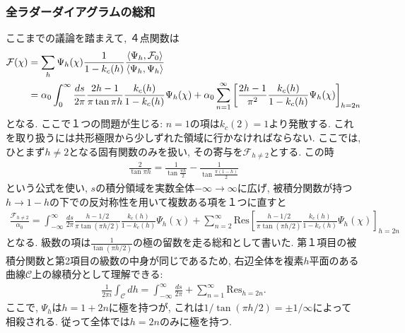 \subsubsection{全ラダーダイアグラムの総和}
ここまでの議論を踏まえて, ４点関数は
\begin{align}
	\mathcal{F}(\chi)
	&= \sum_h\Psi_h(\chi)\frac{1}{1 - k_c(h)}
		\frac{\langle \Psi_h, \mathcal{F}_0 \rangle}{\langle \Psi_h, \Psi_h \rangle}\nonumber\\
	&= \alpha_0\int_0^{\infty}\frac{ds}{2\pi}\frac{2h-1}{\pi\tan\pi h}
		\frac{k_c(h)}{1-k_c(h)}\Psi_h(\chi)
	+ \alpha_0\sum_{n=1}^{\infty}\left[
		\frac{2h-1}{\pi^2}\frac{k_c(h)}{1-k_c(h)}\Psi_h(\chi)
	\right]_{h=2n}
	\label{eq:all_sum_of_ladders}
\end{align}
となる. 
ここで１つの問題が生じる: $n = 1$の項は$k_c(2) = 1$より発散する. 
これを取り扱うには共形極限から少しずれた領域に行かなければならない. 
ここでは, ひとまず$h\neq2$となる固有関数のみを扱い, その寄与を$\mathcal{F}_{h\neq2}$とする.
この時
\begin{align}
	\frac{2}{\tan\pi h} = \frac{1}{\tan\frac{\pi h}{2}} - \frac{1}{\tan\frac{\pi(1-h)}{2}}
\end{align}
という公式を使い, $s$の積分領域を実数全体$-\infty\to\infty$に広げ, 
被積分関数が持つ$h\to1-h$の下での反対称性を用いて複数ある項を１つに直すと
\begin{align}
	\frac{\mathcal{F}_{h\neq2}}{\alpha_0}
	= \int_{-\infty}^{\infty}\frac{ds}{2\pi}\frac{h - 1/2}{\pi\tan(\pi h / 2)}
		\frac{k_c(h)}{1-k_c(h)}\Psi_h(\chi)
	+ \sum_{n=2}^{\infty}\mathrm{Res}\left[
			\frac{h-1/2}{\pi\tan(\pi h/2)}\frac{k_c(h)}{1-k_c(h)}\Psi_h(\chi)
		\right]_{h=2n}
\end{align}
となる. 
級数の項は$\frac{1}{\tan(\pi h/2)}$の極の留数を走る総和として書いた. 
第１項目の被積分関数と第2項目の級数の中身が同じであるため, 
右辺全体を複素$h$平面のある曲線$\mathcal{C}$上の線積分として理解できる:
\begin{align}
	\frac{1}{2\pi i}\int_{\mathcal{C}}dh
	= \int_{-\infty}^{\infty}\frac{ds}{2\pi}
	+ \sum_{n=1}^{\infty}\mathrm{Res}_{h=2n}.
\end{align}
ここで, $\Psi_h$は$h = 1 + 2n$に極を持つが, これは$1/\tan(\pi h / 2) = \pm 1/\infty$によって
相殺される. 従って全体では$h = 2n$のみに極を持つ. 


